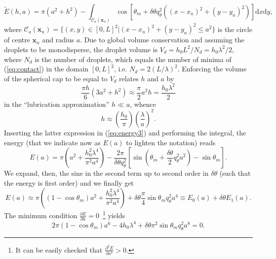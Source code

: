 \documentclass[amsmath,amssymb,showpacs,prf,superscriptaddress,notitlepage,longbibliography]{revtex4-1}
\begin{document}
\begin{equation}\label{eq:energy3}
  \tilde{E}(h,a) = \pi(a^2 + h^2) -
  \int_{\mathcal{C}_a(\mathbf{x}_n)} \cos\left[\theta_m + \delta \theta q_{\theta}^2 ((x-x_n)^2 + (y - y_n)^2)\right]
    \text{d}x\text{d}y,
\end{equation}  
where
$\mathcal{C}_a(\mathbf{x}_n)=\{(x,y) \in [0, L]^2|(x-x_n)^2 + (y-y_n)^2 \leq a^2\}$ is the circle of centre $\mathbf{x}_n$ and radius $a$. 
Due to global volume conservation and assuming the droplets to be monodisperse, the droplet volume is $V_d = h_0L^2/N_d = h_0 \lambda^2/2$, where $N_d$ is the number of droplets, which equals the number of minima of (\ref{eq:contact}) in the domain $[0, L]^2$, i.e. $N_d = 2(L/\lambda)^2$.
Enforcing the volume of the spherical cap to be equal to $V_d$ relates $h$ and $a$ by
\begin{equation}
\frac{\pi h}{6}(3a^2 + h^2) \approx \frac{\pi}{2} a^2 h =  \frac{h_0 \lambda^2}{2}    
\end{equation}
in the ``lubrication approximation'' $h \ll a$, whence
\begin{equation}
  h \approx \left(\frac{h_0}{\pi}\right) \left(\frac{\lambda}{a}\right)^2.
\end{equation}  
Inserting the latter expression in (\ref{eq:energy3}) and performing the integral, the energy (that we indicate now as $E(a)$ to lighten the notation) reads
\begin{equation}\label{eq:energy4}
  E(a) = \pi \left(a^2 + \frac{h_0^2 \lambda^4}{\pi^2 a^4} \right) - \frac{2\pi}{\delta \theta q_{\theta}^2}
  \left[\sin\left(\theta_m +\frac{\delta \theta}{2}q_{\theta}^2a^2\right) - \sin \theta_m \right].
\end{equation}  
We expand, then, the sine in the second term up to second order in $\delta \theta$ (such that the energy is first order) and we finally get
\begin{equation}\label{eq:energyfin}
  E(a) \approx  \pi \left((1-\cos \theta_m) a^2 + \frac{h_0^2 \lambda^4}{\pi^2 a^4} \right)
  + \delta \theta \frac{\pi}{4}\sin \theta_m q_{\theta}^2 a^4 \equiv E_0(a) + \delta \theta E_1(a).
\end{equation}  
The minimum condition $\frac{\partial E}{\partial a} = 0$~\footnote{It can be easily checked that 
$\frac{\partial^2 E}{\partial a^2} > 0$.} yields   
\begin{equation}\label{eq:minim}
2\pi (1-\cos \theta_m)a^6 - 4h_0 \lambda^4 + \delta \theta \pi^2 \sin \theta_m q_{\theta}^2 a^8 =0.
\end{equation}  
\end{document}

